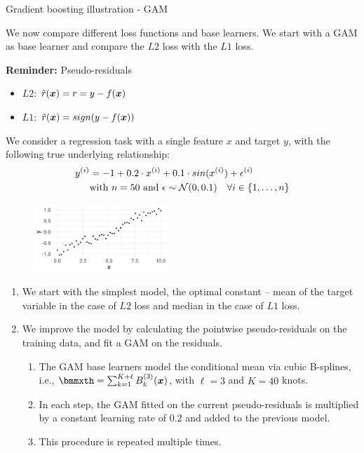 \begin{vbframe}{Gradient boosting illustration - GAM}

We now compare different loss functions and base learners.
We start with a GAM as base learner and compare the $L2$ loss with
the $L1$ loss.\\
\vspace*{0.1cm}

\textbf{Reminder:} Pseudo-residuals
\begin{itemize}
\item $L2$: $\tilde{r}(\bm{x}) = r = y - f(\bm{x})$
\item $L1$: $\tilde{r}(\bm{x}) = sign(y - f(\bm{x}))$
\end{itemize}
We consider a regression task with a single feature $x$ and target $y$, with 
the following true underlying relationship:
\vspace{-0.2cm}
\begin{align*}
y^{(i)} &=  -1 + 0.2 \cdot x^{(i)} + 0.1 \cdot sin(x^{(i)}) + \epsilon^{(i)} \\
&\text{with } n = 50 \text{ and } \epsilon \sim \mathcal{N}(0, 0.1) \quad 
\forall i \in \{1, \ldots, n\}
\end{align*}

\vfill

\begin{figure}
  \includegraphics[width = 0.45\textwidth]{figure/illustration_data_normal.png}
\end{figure}

\framebreak


\begin{enumerate}
  \item We start with the simplest model, the optimal constant -- mean of the 
  target variable in the case of $L2$ loss and median in the case of $L1$ loss.
  \item We improve the model by calculating the pointwise 
  pseudo-residuals on the training data, and fit a GAM on the residuals.
  \begin{enumerate}
    \item The GAM base learners model the conditional mean via cubic B-splines, 
    i.e., $\bmmxth = \sum_{k = 1}^{K + \ell} B_k^{(3)}(\xv)$, with $\ell = 3$ 
    and $K = 40$ knots.
    \item In each step, the GAM fitted on the current pseudo-residuals is
    multiplied by a constant learning rate of $0.2$ and added to the previous
    model.
    \item This procedure is repeated multiple times.
  \end{enumerate}
\end{enumerate}

\end{vbframe}


